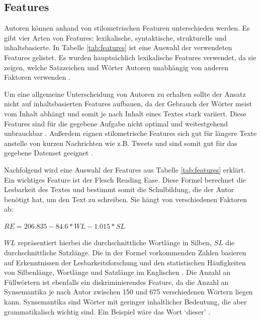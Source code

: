 \documentclass[conference]{IEEEtran}
\begin{document}
\subsection{Features}
	Autoren können anhand von stilometrischen Featuren unterschieden werden. Es gibt vier Arten von Features: lexikalische, syntaktische, strukturelle und inhaltsbasierte. In Tabelle \ref{tab:features} ist eine Auswahl der verwendeten Features gelistet. Es wurden hauptsächlich lexikalische Features verwendet, da sie zeigen, welche Satzzeichen und Wörter Autoren unabhängig von anderen Faktoren verwenden \cite{mf_b1}.
	 
	Um eine allgemeine Unterscheidung von Autoren zu erhalten sollte der Ansatz nicht auf inhaltsbasierten Features aufbauen, da der Gebrauch der Wörter meist vom Inhalt abhängt und somit je nach Inhalt eines Textes stark variiert. Diese Features sind für die gegebene Aufgabe nicht optimal und weitestgehend unbrauchbar \cite{mf_b2}.
	Außerdem eignen stilometrische Features sich gut für längere Texte anstelle von kurzen Nachrichten wie z.B. Tweets und sind somit gut für das gegebene Datenset geeignet \cite{mf_b3}.
	
	Nachfolgend wird eine Auswahl der Features aus Tabelle \ref{tab:features} erklärt.
	Ein wichtiges Feature ist der Flesch Reading Ease. Diese Formel berechnet die Lesbarkeit des Textes und bestimmt somit die Schulbildung, die der Autor benötigt hat, um den Text zu schreiben. Sie hängt von verschiedenen Faktoren ab:
	
	
	$RE = 206.835 - 84.6*WL - 1.015*SL$
	
	
	
	$WL$ repräsentiert hierbei die durchschnittliche Wortlänge in Silben, $SL$ die durchschnittliche Satzlänge. Die in der Formel vorkommenden Zahlen basieren auf Erkenntnissen der Lesbarkeitsforschung und den statistischen Häufigkeiten von Silbenlänge, Wortlänge und Satzlänge im Englischen \cite{mf_b4}.
	Die Anzahl an Füllwörtern ist ebenfalls ein diskriminierendes Feature, da die Anzahl an Synsemantika je nach Autor zwischen 150 und 675 verschiedenen Wörtern liegen kann. Synsemantika sind Wörter mit geringer inhaltlicher Bedeutung, die aber grammatikalisch wichtig sind. Ein Beispiel wäre das Wort ‘dieser’ \cite{mf_b5}.
	
\end{document}
